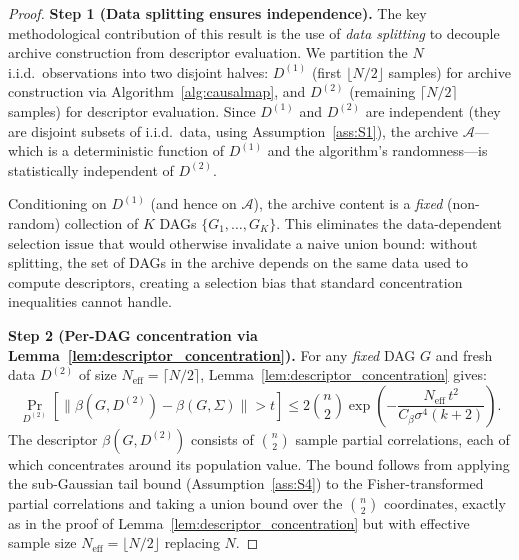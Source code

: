\documentclass{article}
\theoremstyle{definition}
\theoremstyle{plain}
\theoremstyle{remark}
\begin{document}
\begin{proof}
\textbf{Step 1 (Data splitting ensures independence).}
The key methodological contribution of this result is the use of \emph{data splitting}
to decouple archive construction from descriptor evaluation. We partition the $N$ i.i.d.\
observations into two disjoint halves: $D^{(1)}$ (first $\lfloor N/2 \rfloor$ samples)
for archive construction via Algorithm~\ref{alg:causalmap}, and $D^{(2)}$ (remaining
$\lceil N/2 \rceil$ samples) for descriptor evaluation. Since $D^{(1)}$ and $D^{(2)}$
are independent (they are disjoint subsets of i.i.d.\ data, using Assumption~\ref{ass:S1}),
the archive $\mathcal{A}$---which is a deterministic function of $D^{(1)}$ and the
algorithm's randomness---is statistically independent of $D^{(2)}$.

Conditioning on $D^{(1)}$ (and hence on $\mathcal{A}$), the archive content is a
\emph{fixed} (non-random) collection of $K$ DAGs $\{G_1, \ldots, G_K\}$. This eliminates
the data-dependent selection issue that would otherwise invalidate a naive union bound:
without splitting, the set of DAGs in the archive depends on the same data used to compute
descriptors, creating a selection bias that standard concentration inequalities cannot handle.

\textbf{Step 2 (Per-DAG concentration via Lemma~\ref{lem:descriptor_concentration}).}
For any \emph{fixed} DAG $G$ and fresh data $D^{(2)}$ of size $N_{\mathrm{eff}} =
\lceil N/2 \rceil$, Lemma~\ref{lem:descriptor_concentration} gives:
\begin{equation}
  \Pr_{D^{(2)}}[\|\beta(G, D^{(2)}) - \beta(G, \Sigma)\| > t]
  \leq 2\binom{n}{2}\exp\!\left(-\frac{N_{\mathrm{eff}} \, t^2}{C_\beta\sigma^4(k+2)}\right).
\end{equation}
The descriptor $\beta(G, D^{(2)})$ consists of $\binom{n}{2}$ sample partial correlations,
each of which concentrates around its population value. The bound follows from applying
the sub-Gaussian tail bound (Assumption~\ref{ass:S4}) to the Fisher-transformed partial
correlations and taking a union bound over the $\binom{n}{2}$ coordinates, exactly as in
the proof of Lemma~\ref{lem:descriptor_concentration} but with effective sample size
$N_{\mathrm{eff}} = \lfloor N/2 \rfloor$ replacing $N$.


\end{proof}
\end{document}
